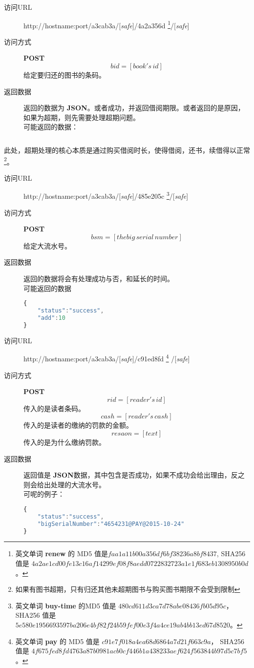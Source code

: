 \documentclass[UTF8]{article}
\def\safe{/[\textit{safe}]}
\def\POST{\colorbox[rgb]{0.77,0.53,0.97}{\textbf{POST}}}
\def\bfJSON{\textbf{JSON}}
\def\viaurl{\item[{\quad\colorbox[rgb]{0.47,0.88,0.89}{访问URL}}]}
\def\viareq#1{\item[{\quad\colorbox[rgb]{0.57,0.88,0.99}{访问方式}}] #1}
\def\rtdata{\item[{\quad\colorbox[rgb]{0.70,0.9,0.59}{返回数据}}]}
\begin{document}
        \begin{description}
	        \viaurl http://hostname:port/a3cab3a\safe/4a2a356d
		     \footnote{
		     	英文单词 \textbf{renew} 的
		     	MD5 值是$faa1a11b00a356df6bf38236a8bf8437$,
		     	SHA256 值是 $4a2ae1cd00fe13c16af14299ef08f8aedd0722832723a1e1f683eb1308950b0d$。
		     }\safe
		     \viareq{\POST}
		     $$bid=[book's\,id]$$
		     给定要归还的图书的条码。
		     \rtdata 返回的数据为 \bfJSON 。或者成功，并返回借阅期限。或者返回的是原因，如果为超期，则先需要处理超期问题。
		     \\ 可能返回的数据：
		     \begin{lstlisting}[]
		     \end{lstlisting}
		      \end{description}
        此处，超期处理的核心本质是通过购买借阅时长，使得借阅，还书，续借得以正常
        \footnote{如果有图书超期，只有归还其他未超期图书与购买图书期限不会受到限制}。
        \begin{description}
            \viaurl http://hostname:port/a3cab3a\safe/485e205c
            \footnote{
               英文单词 \textbf{buy-time} 的MD5 值是
                $480cd611d3ca7d78abe08436fb05d95c$，
                SHA256 值是
                $5e580e1956693597ba206e4bf82f24b59fef00e3f4a4ce19ab4bb13ed67d8520$。
            }\safe
            \viareq{\POST}
            $$bsm=[the big\,serial\,number ]$$
            给定大流水号。
            \rtdata 返回的数据将会有处理成功与否，和延长的时间。
            \\ 可能返回的数据
            \begin{lstlisting}[language=JavaScript]
{
    "status":"success",
    "add":10
}
            \end{lstlisting}
        \end{description}
        \begin{description}
	        \viaurl http://hostname:port/a3cab3a\safe/c91ed8fd
	        \footnote{英文单词 \textbf{pay} 的
	        	MD5 值是 $c91e7f018a4ea68d6864a7d21f663c9a$，
	        	SHA256 值是 $4f675fed8fd4763a87b0981acb0cf446b1a438233aef624f563844b97d5c7bf5$。
	        	}
	        \safe
	        \viareq{\POST}
	        $$rid=[reader's\,id]$$
	        传入的是读者条码。
	        $$cash=[reader's\,cash]$$
	        传入的是读者的缴纳的罚款的金额。
	        $$resaon=[text]$$
	        传入的是为什么缴纳罚款。
	        \rtdata 返回值是 \bfJSON 数据，其中包含是否成功，如果不成功会给出理由，反之则会给出处理的大流水号。
	        \\ 可呢的例子：
	        \begin{lstlisting}[language=JavaScript]
{
	"status":"success",
	"bigSerialNumber":"4654231@PAY@2015-10-24"
}
	        \end{lstlisting}
	    \end{description}
\end{document}
